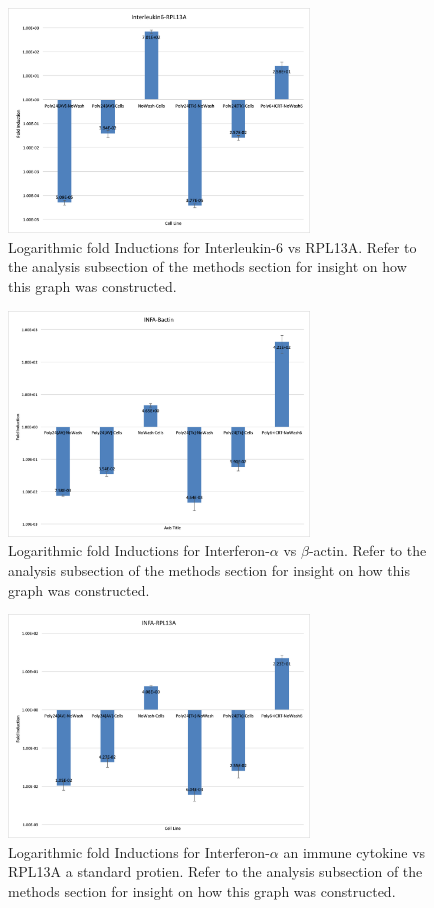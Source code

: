 \documentclass[journal, a4paper]{IEEEtran}
\begin{document}
    \begin{figure}[t]
      \centering
      \includegraphics[width=8cm]{il6-rpl13a}
      \caption{Logarithmic fold Inductions for Interleukin-6 vs RPL13A.
      Refer to the analysis subsection of the methods section for insight on how this graph was constructed.
      }
      \label{fig:mesh1}
    \end{figure}

    \begin{figure}[t]
      \centering
      \includegraphics[width=8cm]{infa-bactin}
      \caption{Logarithmic fold Inductions for Interferon-$\alpha$ vs $\beta$-actin.
      Refer to the analysis subsection of the methods section for insight on how this graph was constructed.
      }
      \label{fig:mesh1}
    \end{figure}

    \begin{figure}[t]
      \centering
      \includegraphics[width=8cm]{infa-rpl13a}
      \caption{
      Logarithmic fold Inductions for Interferon-$\alpha$ an immune cytokine vs RPL13A a standard protien.
      Refer to the analysis subsection of the methods section for insight on how this graph was constructed.
      }
      \label{fig:mesh1}
    \end{figure}
\end{document}
